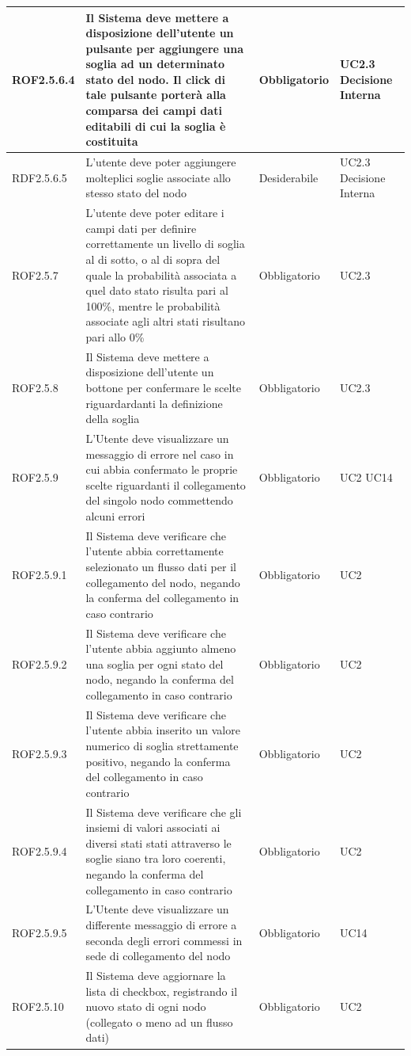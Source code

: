 \begin{center}
\begin{longtable}[c]{|m{}|m{}|m{}|m{}|}
\hline
ROF2.5.6.4 & Il Sistema deve mettere a disposizione dell'utente un pulsante per aggiungere una soglia ad un determinato stato del nodo. Il click di tale pulsante porterà alla comparsa dei campi dati editabili di cui la soglia è costituita & Obbligatorio & UC2.3 Decisione Interna\\
\hline
RDF2.5.6.5 & L'utente deve poter aggiungere molteplici soglie associate allo stesso stato del nodo & Desiderabile & UC2.3 Decisione Interna\\
\hline
\rowcolor{grigio}ROF2.5.7 & L'utente deve poter editare i campi dati per definire correttamente un livello di soglia al di sotto, o al di sopra del quale la probabilità associata a quel dato stato risulta pari al 100\%, mentre le probabilità associate agli altri stati risultano pari allo 0\% & Obbligatorio & UC2.3\\
\hline
ROF2.5.8 & Il Sistema deve mettere a disposizione dell'utente un bottone per confermare le scelte riguardardanti la definizione della soglia & Obbligatorio & UC2.3\\
\hline
\rowcolor{grigio}ROF2.5.9 & L'Utente deve visualizzare un messaggio di errore nel caso in cui abbia confermato le proprie scelte riguardanti il collegamento del singolo nodo commettendo alcuni errori & Obbligatorio & UC2 UC14\\
\hline
ROF2.5.9.1 & Il Sistema deve verificare che l'utente abbia correttamente selezionato un flusso dati per il collegamento del nodo, negando la conferma del collegamento in caso contrario & Obbligatorio & UC2\\
\hline
ROF2.5.9.2 & Il Sistema deve verificare che l'utente abbia aggiunto almeno una soglia per ogni stato del nodo, negando la conferma del collegamento in caso contrario & Obbligatorio & UC2\\
\hline
ROF2.5.9.3 & Il Sistema deve verificare che l'utente abbia inserito un valore numerico di soglia strettamente positivo, negando la conferma del collegamento in caso contrario & Obbligatorio & UC2\\
\hline
ROF2.5.9.4 & Il Sistema deve verificare che gli insiemi di valori associati ai diversi stati stati attraverso le soglie siano tra loro coerenti, negando la conferma del collegamento in caso contrario & Obbligatorio & UC2\\
\hline
ROF2.5.9.5 & L'Utente deve visualizzare un differente messaggio di errore a seconda degli errori commessi in sede di collegamento del nodo & Obbligatorio & UC14\\
\hline
ROF2.5.10 & Il Sistema deve aggiornare la lista di checkbox, registrando il nuovo stato di ogni nodo (collegato o meno ad un flusso dati) & Obbligatorio & UC2\\

\end{longtable}
\end{center}
